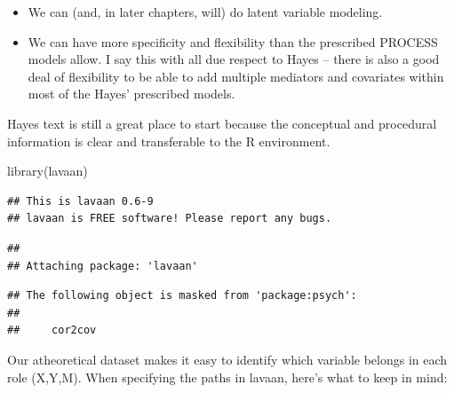 \documentclass[
  11pt,
]{book}
\newenvironment{Shaded}{\begin{snugshade}}{\end{snugshade}}
\newcommand{\FunctionTok}[1]{\textcolor[rgb]{0.00,0.00,0.00}{#1}}
\newcommand{\NormalTok}[1]{#1}
\providecommand{\tightlist}{%
  \setlength{\itemsep}{0pt}\setlength{\parskip}{0pt}}
\begin{document}
\begin{itemize}
\tightlist
\item
  We can (and, in later chapters, will) do latent variable modeling.
\item
  We can have more specificity and flexibility than the prescribed PROCESS models allow. I say this with all due respect to Hayes -- there is also a good deal of flexibility to be able to add multiple mediators and covariates within most of the Hayes' prescribed models.
\end{itemize}

Hayes text is still a great place to start because the conceptual and procedural information is clear and transferable to the R environment.

\begin{Shaded}
\begin{Highlighting}[]
\FunctionTok{library}\NormalTok{(lavaan)}
\end{Highlighting}
\end{Shaded}

\begin{verbatim}
## This is lavaan 0.6-9
## lavaan is FREE software! Please report any bugs.
\end{verbatim}

\begin{verbatim}
## 
## Attaching package: 'lavaan'
\end{verbatim}

\begin{verbatim}
## The following object is masked from 'package:psych':
## 
##     cor2cov
\end{verbatim}

Our atheoretical dataset makes it easy to identify which variable belongs in each role (X,Y,M). When specifying the paths in lavaan, here's what to keep in mind:
\end{document}
